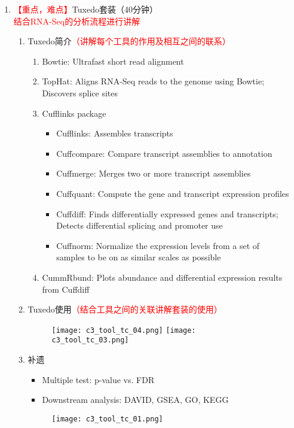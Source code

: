 \documentclass{TIJMUjiaoanLL}
\begin{document}
\begin{enumerate}
  \item \textcolor{red}{【重点，难点】}Tuxedo套装（40分钟）
    \\ \textcolor{red}{结合RNA-Seq的分析流程进行讲解}
    \begin{enumerate}
      \item Tuxedo简介\textcolor{red}{（讲解每个工具的作用及相互之间的联系）}
        \begin{enumerate}
          \item Bowtie: Ultrafast short read alignment
          \item TopHat: Aligns RNA-Seq reads to the genome using Bowtie; Discovers splice sites
          \item Cufflinks package
            \begin{itemize}
              \item Cufflinks: Assembles transcripts
              \item Cuffcompare: Compare transcript assemblies to annotation
              \item Cuffmerge: Merges two or more transcript assemblies
              \item Cuffquant: Compute the gene and transcript expression profiles
              \item Cuffdiff: Finds differentially expressed genes and transcripts;\\ Detects differential splicing and promoter use
              \item Cuffnorm: Normalize the expression levels from a set of\\ samples to be on as similar scales as possible
            \end{itemize}
          \item CummRbund: Plots abundance and differential expression results from Cuffdiff
        \end{enumerate}
      \item Tuxedo使用\textcolor{red}{（结合工具之间的关联讲解套装的使用）}
        \begin{figure}[h]
          \centering
          \texttt{[image: c3\_tool\_tc\_04.png]}
          \texttt{[image: c3\_tool\_tc\_03.png]}
        \end{figure}

\otherTail
\newpage
\otherHeader

      \item 补遗
        \begin{itemize}
          \item Multiple test: p-value vs. FDR
          \item Downstream analysis: DAVID, GSEA, GO, KEGG
        \end{itemize}
        \begin{figure}[h]
          \centering
          \texttt{[image: c3\_tool\_tc\_01.png]}
        \end{figure}
    \end{enumerate}


\end{enumerate}
\end{document}
